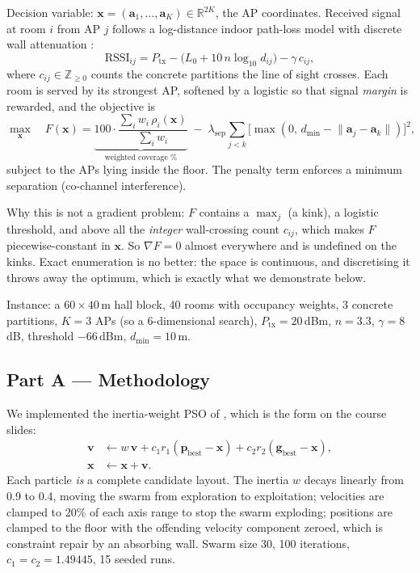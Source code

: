 \documentclass{ai-lab-report}
\begin{document}
Decision variable: $\mathbf{x} = (\mathbf{a}_1, \dots, \mathbf{a}_K) \in \mathbb{R}^{2K}$, the
AP coordinates. Received signal at room $i$ from AP $j$ follows a log-distance indoor path-loss
model with discrete wall attenuation \citep{rappaport2002wireless}:
\begin{equation}
\mathrm{RSSI}_{ij} = P_{\text{tx}} - \bigl(L_0 + 10\,n \log_{10} d_{ij}\bigr) - \gamma\, c_{ij},
\end{equation}
where $c_{ij} \in \mathbb{Z}_{\geq 0}$ counts the concrete partitions the line of sight crosses.
Each room is served by its strongest AP, softened by a logistic so that signal \emph{margin}
is rewarded, and the objective is
\begin{equation}
\max_{\mathbf{x}} \quad F(\mathbf{x}) = \underbrace{100 \cdot \frac{\sum_i w_i\, \rho_i(\mathbf{x})}{\sum_i w_i}}_{\text{weighted coverage \%}}
\; - \; \lambda_{\text{sep}} \sum_{j<k} \bigl[\max(0,\, d_{\min} - \lVert \mathbf{a}_j - \mathbf{a}_k \rVert)\bigr]^2,
\end{equation}
subject to the APs lying inside the floor. The penalty term enforces a minimum separation
(co-channel interference).

Why this is not a gradient problem: $F$ contains a $\max_j$ (a kink), a logistic threshold,
and above all the \emph{integer} wall-crossing count $c_{ij}$, which makes $F$
piecewise-constant in $\mathbf{x}$. So $\nabla F = 0$ almost everywhere and is undefined on the
kinks. Exact enumeration is no better: the space is continuous, and discretising it throws
away the optimum, which is exactly what we demonstrate below.

Instance: a $60 \times 40$\,m hall block, 40 rooms with occupancy weights, 3 concrete
partitions, $K = 3$ APs (so a 6-dimensional search), $P_{\text{tx}} = 20$\,dBm,
$n = 3.3$, $\gamma = 8$\,dB, threshold $-66$\,dBm, $d_{\min} = 10$\,m.

\subsection{Part A --- Methodology}
We implemented the inertia-weight PSO of \citet{shi1998inertia}, which is the form on the
course slides:
\begin{align}
\mathbf{v} &\leftarrow w\,\mathbf{v} + c_1 r_1 (\mathbf{p}_{\text{best}} - \mathbf{x})
                                     + c_2 r_2 (\mathbf{g}_{\text{best}} - \mathbf{x}), \\
\mathbf{x} &\leftarrow \mathbf{x} + \mathbf{v}.
\end{align}
Each particle \emph{is} a complete candidate layout. The inertia $w$ decays linearly from 0.9
to 0.4, moving the swarm from exploration to exploitation; velocities are clamped to 20\% of
each axis range to stop the swarm exploding; positions are clamped to the floor with the
offending velocity component zeroed, which is constraint repair by an absorbing wall.
Swarm size 30, 100 iterations, $c_1 = c_2 = 1.49445$, 15 seeded runs.
\end{document}
